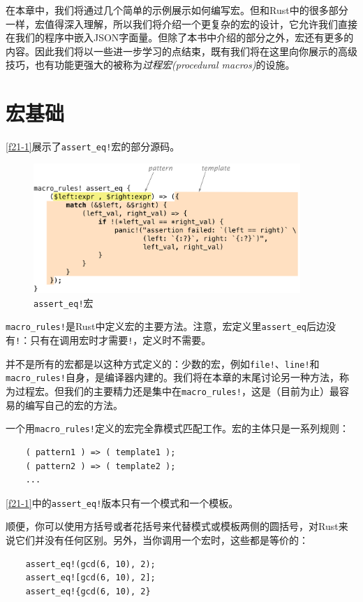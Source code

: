 在本章中，我们将通过几个简单的示例展示如何编写宏。但和Rust中的很多部分一样，宏值得深入理解，所以我们将介绍一个更复杂的宏的设计，它允许我们直接在我们的程序中嵌入JSON字面量。但除了本书中介绍的部分之外，宏还有更多的内容。因此我们将以一些进一步学习的点结束，既有我们将在这里向你展示的高级技巧，也有功能更强大的被称为\emph{过程宏(procedural macros)}的设施。

\section{宏基础}
\autoref{f21-1}展示了\texttt{assert\_eq!}宏的部分源码。

\begin{figure}[htbp]
    \centering
    \includegraphics[width=0.9\textwidth]{../img/f21-1.png}
    \caption{\texttt{assert\_eq!}宏}
    \label{f21-1}
\end{figure}

\texttt{macro\_rules!}是Rust中定义宏的主要方法。注意，宏定义里\texttt{assert\_eq}后边没有\texttt{!}：只有在调用宏时才需要\texttt{!}，定义时不需要。

并不是所有的宏都是以这种方式定义的：少数的宏，例如\texttt{file!}、\texttt{line!}和\texttt{macro\_rules!}自身，是编译器内建的。我们将在本章的末尾讨论另一种方法，称为过程宏。但我们的主要精力还是集中在\texttt{macro\_rules!}，这是（目前为止）最容易的编写自己的宏的方法。

一个用\texttt{macro\_rules!}定义的宏完全靠模式匹配工作。宏的主体只是一系列规则：
\begin{verbatim}
    ( pattern1 ) => ( template1 );
    ( pattern2 ) => ( template2 );
    ...
\end{verbatim}

\autoref{f21-1}中的\texttt{assert\_eq!}版本只有一个模式和一个模板。

顺便，你可以使用方括号或者花括号来代替模式或模板两侧的圆括号，对Rust来说它们并没有任何区别。另外，当你调用一个宏时，这些都是等价的：
\begin{verbatim}
    assert_eq!(gcd(6, 10), 2);
    assert_eq![gcd(6, 10), 2];
    assert_eq!{gcd(6, 10), 2}
\end{verbatim}


